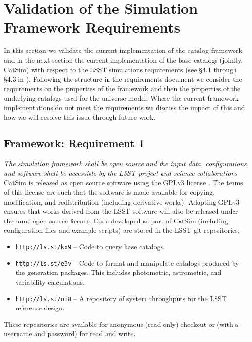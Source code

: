\documentclass[11pt]{article}
\begin{document}
\section{Validation of the Simulation Framework Requirements}

In this section we validate the current implementation of the
catalog framework and in the next section the current implementation
of the base catalogs (jointly, CatSim) with respect to the LSST simulations
requirements (see \S 4.1 through \S 4.3 in
\citealt{requirements}). Following the structure in the requirements
document we consider the requirements on the properties of the
framework and then the properties of the underlying catalogs used for
the universe model.  Where the current framework implementations do
not meet the requirements we discuss the impact of this and how we
will resolve this issue through future work.

\subsection{Framework: Requirement 1}

{\it  The simulation framework shall be open source and the input data, configurations,
and software shall be accessible by the LSST project and science
collaborations}\\

CatSim is released as open source software using the GPLv3 license
\citep{gpl}. The terms of this license are such that the software is
made available for copying, modification, and redistribution
(including derivative works). Adopting GPLv3 ensures that works
derived from the LSST software will also be released under the same
open-source license. Code developed as part of CatSim (including
configuration files and example scripts) are stored in the LSST 
git repositories,

\begin{itemize}
\item {\tt http://ls.st/kx9} -- Code to query
base catalogs.
\item {\tt http://ls.st/e3v} -- Code to format
and manipulate catalogs produced by the generation packages.  This includes photometric, 
astrometric, and variability calculations.
\item {\tt http://ls.st/oi8}
  -- A repository
of system throughputs for the LSST reference design.
\end{itemize}

These repositories are available for anonymous (read-only) checkout or
(with a username and password) for read and write.
\end{document}
